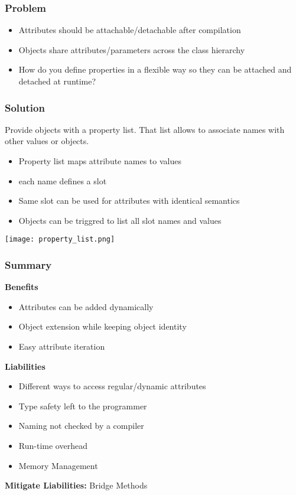 \subsubsection{Problem}
\begin{itemize}[topsep=0pt]
    \itemsep -0.4em
    \item Attributes should be attachable/detachable after compilation
    \item Objects share attributes/parameters across the class hierarchy
    \item How do you define properties in a flexible way so they can be attached and detached at runtime?
\end{itemize}
\subsubsection{Solution}
Provide objects with a property list. That list allows to associate names with other values or objects.
\begin{itemize}[topsep=0pt]
    \itemsep -0.4em
    \item Property list maps attribute names to values
    \item each name defines a slot
    \item Same slot can be used for attributes with identical semantics
    \item Objects can be triggred to list all slot names and values
\end{itemize}
\texttt{[image: property\_list.png]}
\subsubsection{Summary}
\textbf{Benefits}
\begin{itemize}[topsep=0pt]
    \itemsep -0.4em
    \item Attributes can be added dynamically
    \item Object extension while keeping object identity
    \item Easy attribute iteration
\end{itemize}
\textbf{Liabilities}
\begin{itemize}[topsep=0pt]
    \itemsep -0.4em
    \item Different ways to access regular/dynamic attributes
    \item Type safety left to the programmer
    \item Naming not checked by a compiler
    \item Run-time overhead
    \item Memory Management
\end{itemize}
\textbf{Mitigate Liabilities:} Bridge Methods

